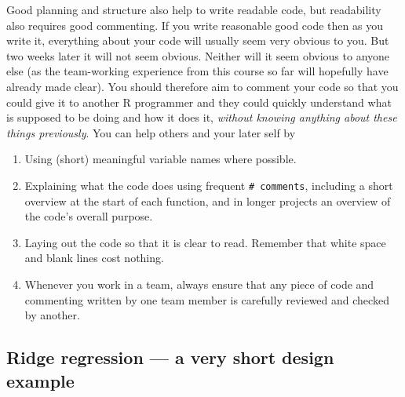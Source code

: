 \documentclass[10pt] {article}
\theoremstyle{definition}
\begin{document}
Good planning and structure also help to write readable code, but readability also requires good commenting. If you write reasonable good code then as you write it, everything about your code will usually seem very obvious to you. But two weeks later it will not seem obvious. Neither will it seem obvious to anyone else (as the team-working experience from this course so far will hopefully have already made clear). You should therefore aim to comment your code so that you could give it to another R programmer and they could quickly understand what is supposed to be doing and how it does it, {\em without knowing anything about these things previously}. You can help others and your later self by
\begin{enumerate}
\item Using (short) meaningful variable names where possible.
\item Explaining what the code does using frequent \verb+# comments+, including a short overview at the start of each function, and in longer projects an overview of the code's overall purpose. 
\item Laying out the code so that it is clear to read. Remember that white space and blank lines cost nothing.
\item Whenever you work in a team, always ensure that any piece of code and commenting written by one team member is carefully reviewed and checked by another.    
\end{enumerate}  

\subsection{Ridge regression ---  a very short design example \label{sec:ridge}}
\end{document}
